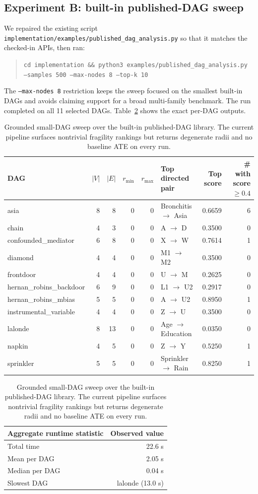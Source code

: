 \documentclass[11pt]{article}
\begin{document}
\subsection{Experiment B: built-in published-DAG sweep}

We repaired the existing script \texttt{implementation/examples/published\_dag\_analysis.py} so that it matches the checked-in APIs, then ran:
\begin{quote}
\texttt{cd implementation \&\& python3 examples/published\_dag\_analysis.py --samples 500 --max-nodes 8 --top-k 10}
\end{quote}

The \texttt{--max-nodes 8} restriction keeps the sweep focused on the smallest built-in DAGs and avoids claiming support for a broad multi-family benchmark. The run completed on all 11 selected DAGs. Table~\ref{tab:published} shows the exact per-DAG outputs.

\begin{table}[p]
\centering
\caption{Grounded small-DAG sweep over the built-in published-DAG library. The current pipeline surfaces nontrivial fragility rankings but returns degenerate radii and no baseline ATE on every run.}
\label{tab:published}
\small
\begin{tabularx}{\textwidth}{@{}lrrrrXrr@{}}
\toprule
DAG & $|V|$ & $|E|$ & $r_{\min}$ & $r_{\max}$ & Top directed pair & Top score & \# with score $\ge 0.4$ \\
\midrule
asia & 8 & 8 & 0 & 0 & Bronchitis $\to$ Asia & 0.6659 & 6 \\
chain & 4 & 3 & 0 & 0 & A $\to$ D & 0.3500 & 0 \\
confounded\_mediator & 6 & 8 & 0 & 0 & X $\to$ W & 0.7614 & 1 \\
diamond & 4 & 4 & 0 & 0 & M1 $\to$ M2 & 0.3500 & 0 \\
frontdoor & 4 & 4 & 0 & 0 & U $\to$ M & 0.2625 & 0 \\
hernan\_robins\_backdoor & 6 & 9 & 0 & 0 & L1 $\to$ U2 & 0.2917 & 0 \\
hernan\_robins\_mbias & 5 & 5 & 0 & 0 & A $\to$ U2 & 0.8950 & 1 \\
instrumental\_variable & 4 & 4 & 0 & 0 & Z $\to$ U & 0.3500 & 0 \\
lalonde & 8 & 13 & 0 & 0 & Age $\to$ Education & 0.0350 & 0 \\
napkin & 4 & 5 & 0 & 0 & Z $\to$ Y & 0.5250 & 1 \\
sprinkler & 5 & 5 & 0 & 0 & Sprinkler $\to$ Rain & 0.8250 & 1 \\
\bottomrule
\end{tabularx}
\vspace{0.5em}

\begin{tabular}{@{}lr@{}}
\toprule
Aggregate runtime statistic & Observed value \\
\midrule
Total time & 22.6 s \\
Mean per DAG & 2.05 s \\
Median per DAG & 0.04 s \\
Slowest DAG & lalonde (13.0 s) \\
\bottomrule
\end{tabular}
\end{table}
\end{document}
